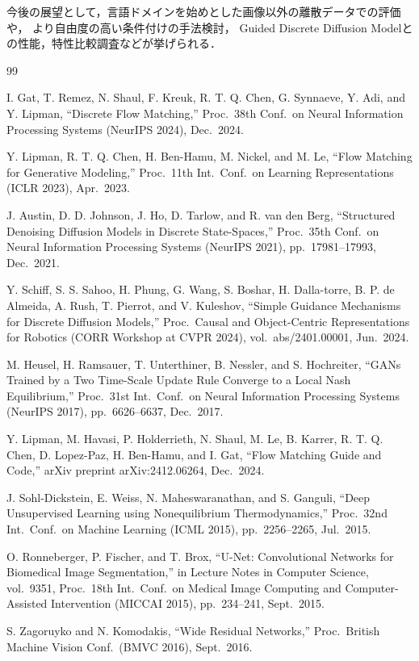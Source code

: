 \documentclass[11pt]{jsarticle}  %
\renewcommand{\baselinestretch}{1.0} %
\begin{document}
今後の展望として，言語ドメインを始めとした画像以外の離散データでの評価や，
より自由度の高い条件付けの手法検討，
Guided Discrete Diffusion Modelとの性能，特性比較調査などが挙げられる．


\vspace{8ex}

\newpage
\begin{thebibliography}{99}
\setlength{\itemsep}{1.5pt}

I. Gat, T. Remez, N. Shaul, F. Kreuk, R. T. Q. Chen, G. Synnaeve, Y. Adi, and Y. Lipman,
``Discrete Flow Matching,''
Proc.\ 38th Conf.\ on Neural Information Processing Systems (NeurIPS 2024),
Dec.~2024.

Y. Lipman, R. T. Q. Chen, H. Ben-Hamu, M. Nickel, and M. Le,
``Flow Matching for Generative Modeling,''
Proc.\ 11th Int.\ Conf.\ on Learning Representations (ICLR 2023),
Apr.~2023.

J. Austin, D. D. Johnson, J. Ho, D. Tarlow, and R. van den Berg,
``Structured Denoising Diffusion Models in Discrete State-Spaces,''
Proc.\ 35th Conf.\ on Neural Information Processing Systems (NeurIPS 2021),
pp.~17981--17993, Dec.~2021.

Y. Schiff, S. S. Sahoo, H. Phung, G. Wang, S. Boshar, H. Dalla-torre, B. P. de Almeida, A. Rush, T. Pierrot, and V. Kuleshov,
``Simple Guidance Mechanisms for Discrete Diffusion Models,''
Proc.\ Causal and Object-Centric Representations for Robotics (CORR Workshop at CVPR 2024),
vol.~abs/2401.00001, Jun.~2024.

M. Heusel, H. Ramsauer, T. Unterthiner, B. Nessler, and S. Hochreiter,
``GANs Trained by a Two Time-Scale Update Rule Converge to a Local Nash Equilibrium,''
Proc.\ 31st Int.\ Conf.\ on Neural Information Processing Systems (NeurIPS 2017),
pp.~6626--6637, Dec.~2017.

Y. Lipman, M. Havasi, P. Holderrieth, N. Shaul, M. Le, B. Karrer, R. T. Q. Chen, D. Lopez-Paz, H. Ben-Hamu, and I. Gat,
``Flow Matching Guide and Code,''
arXiv preprint arXiv:2412.06264, Dec.~2024.

J. Sohl-Dickstein, E. Weiss, N. Maheswaranathan, and S. Ganguli,
``Deep Unsupervised Learning using Nonequilibrium Thermodynamics,''
Proc.\ 32nd Int.\ Conf.\ on Machine Learning (ICML 2015),
pp.~2256--2265, Jul.~2015.

O. Ronneberger, P. Fischer, and T. Brox,
``U-Net: Convolutional Networks for Biomedical Image Segmentation,''
in Lecture Notes in Computer Science, vol.\ 9351, 
Proc.\ 18th Int.\ Conf.\ on Medical Image Computing and Computer-Assisted Intervention (MICCAI 2015),
pp.~234--241, Sept.~2015.

S. Zagoruyko and N. Komodakis,
``Wide Residual Networks,''
Proc.\ British Machine Vision Conf.\ (BMVC 2016),
Sept.~2016.

\end{thebibliography}
\end{document}
